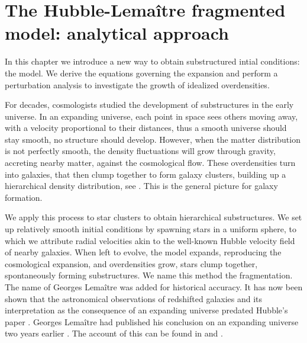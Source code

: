 
\chapter{The Hubble-Lema\^itre fragmented model: analytical approach} 
\label{Chap:analytical}

In this chapter we introduce a new way to obtain substructured intial conditions: the \HubLem model. We derive the equations governing the expansion and perform a perturbation analysis to investigate the growth of idealized overdensities.

\minitoc







For decades, cosmologists studied the development of substructures in the early universe. In an expanding universe, each point in space sees others moving away, with a velocity proportional to their distances, thus a smooth universe should stay smooth, no structure should develop. However, when the matter distribution is not perfectly smooth, the density fluctuations will grow through gravity, accreting nearby matter, against the cosmological flow.  These overdensities turn into galaxies, that then clump together to form galaxy clusters, building up a hierarchical density distribution, see \cite{White1978,Aarseth1979}. This is the general picture for galaxy formation.

We apply this process to star clusters to obtain hierarchical substructures. We set up relatively smooth initial conditions by spawning stars in a uniform sphere, to which we attribute radial velocities  akin to the well-known Hubble velocity field of nearby galaxies. When left to evolve, the model expands, reproducing the cosmological expansion, and overdensities grow, stars clump together, spontaneously forming substructures. We name this method the \HubLem fragmentation. The name of Georges Lema\^itre was added for historical accuracy. It has now been shown that the astronomical observations of redshifted galaxies and its interpretation as the consequence of an expanding universe predated Hubble's paper \citep{Hubble1929}. Georges Lema\^itre had published his conclusion on an expanding universe two years earlier \citep{Lemaitre1927}. The account of this can be found in \cite{Kragh2003,VanDenBergh2011} and \cite{Freeman2015}.

